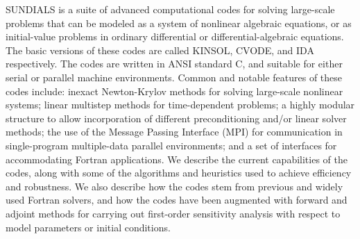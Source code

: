 SUNDIALS is a suite of advanced computational codes for solving
large-scale problems that can be modeled as a system of nonlinear
algebraic equations, or as initial-value problems in ordinary
differential or differential-algebraic equations. The basic versions
of these codes are called KINSOL, CVODE, and IDA respectively. The
codes are written in ANSI standard C, and suitable for either serial
or parallel machine environments.  Common and notable features of
these codes include: inexact Newton-Krylov methods for solving
large-scale nonlinear systems; linear multistep methods for
time-dependent problems; a highly modular structure to allow
incorporation of different preconditioning and/or linear solver
methods; the use of the Message Passing Interface (MPI) for
communication in single-program multiple-data parallel environments;
and a set of interfaces for accommodating Fortran applications.  We
describe the current capabilities of the codes, along with some of the
algorithms and heuristics used to achieve efficiency and robustness.
We also describe how the codes stem from previous and widely used
Fortran solvers, and how the codes have been augmented with forward
and adjoint methods for carrying out first-order sensitivity analysis
with respect to model parameters or initial conditions.
